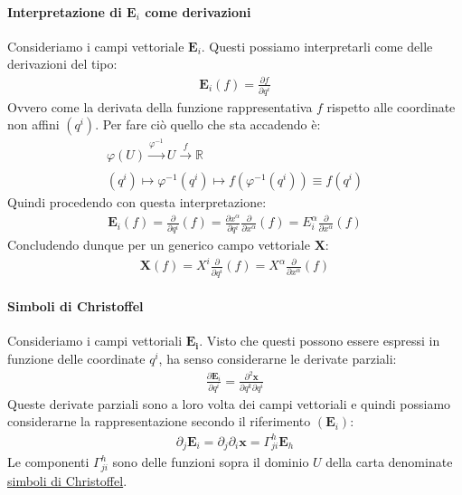 \documentclass[10pt,a4paper]{book}
\begin{document}
\paragraph{Interpretazione di $\mathbf{E}_i$ come derivazioni} Consideriamo i campi vettoriale $\mathbf{E}_i$. Questi possiamo interpretarli come delle derivazioni del tipo:
\begin{align*}
    \mathbf{E}_i(f)=\frac{\partial f}{\partial q^i}
\end{align*}
Ovvero come la derivata della funzione rappresentativa $f$ rispetto alle coordinate non affini $(q^i)$. Per fare ciò quello che sta accadendo è:
\begin{align*}
    \varphi (U)\xrightarrow[]{\varphi^{-1}} U\xrightarrow[]{f} \mathbb{R}\\
    (q^i)\mapsto\varphi^{-1}(q^i)\mapsto f(\varphi^{-1}(q^i))\equiv f(q^i)
\end{align*}
Quindi procedendo con questa interpretazione:
\begin{align*}
    \mathbf{E}_i(f)=\frac{\partial}{\partial q^i}(f)=\frac{\partial x^\alpha}{\partial q^i}\frac{\partial}{\partial x^\alpha}(f)=E^\alpha_i\frac{\partial}{\partial x^\alpha}(f)
\end{align*}
Concludendo dunque per un generico campo vettoriale $\mathbf{X}$:
\begin{align*}
    \mathbf{X}(f)=X^i\frac{\partial}{\partial q^i}(f)=X^\alpha \frac{\partial}{\partial x^\alpha}(f)
\end{align*}
\paragraph{Simboli di Christoffel} Consideriamo i campi vettoriali $\mathbf{E_i}$. Visto che questi possono essere espressi in funzione delle coordinate $q^i$, ha senso considerarne le derivate parziali:
\begin{align*}
    \frac{\partial \mathbf{E}_i}{\partial q^i}=\frac{\partial^2\mathbf{x}}{\partial q^k\partial q^i}
\end{align*}
Queste derivate parziali sono a loro volta dei campi vettoriali e quindi possiamo considerarne la rappresentazione secondo il riferimento $(\mathbf{E}_i)$:
\begin{align*}
    \partial_j\mathbf{E}_i=\partial_j\partial_i\mathbf{x}=\Gamma^h_{ji}\mathbf{E}_h
\end{align*}
Le componenti $\Gamma^h_{ji}$ sono delle funzioni sopra il dominio $U$ della carta denominate \underline{simboli di Christoffel}.
\end{document}
